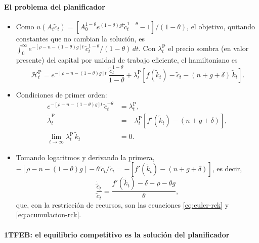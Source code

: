 \documentclass[11pt]{article}
\begin{document}
\paragraph{El problema del planificador}

\begin{itemize}
\item Como $u(A_t\tilde c_t)=\left[A_0^{1-\theta}e^{(1-\theta)gt}\tilde c_t^{1-\theta}-1\right]/(1-\theta)$, el objetivo, quitando constantes que no cambian la solución, es $\int_0^{\infty}e^{-[\rho-n-(1-\theta)g]t}\,\tilde c_t^{1-\theta}/(1-\theta)\,dt$. Con $\lambda^{\mathrm{P}}_t$ el precio sombra (en valor presente) del capital por unidad de trabajo eficiente, el hamiltoniano es
  \[\mathcal{H}^{\mathrm{P}}_t=e^{-[\rho-n-(1-\theta)g]t}\,\frac{\tilde c_t^{1-\theta}}{1-\theta}+\lambda^{\mathrm{P}}_t\left[f(\tilde k_t)-\tilde c_t-(n+g+\delta)\,\tilde k_t\right].\]
\item Condiciones de primer orden:
  \begin{align*}
  e^{-[\rho-n-(1-\theta)g]t}\,\tilde c_t^{-\theta}&=\lambda^{\mathrm{P}}_t,\\
  \dot\lambda^{\mathrm{P}}_t&=-\lambda^{\mathrm{P}}_t\left[f'(\tilde k_t)-(n+g+\delta)\right],\\
  \lim_{t\to\infty}\lambda^{\mathrm{P}}_t\,\tilde k_t&=0.
  \end{align*}
\item Tomando logaritmos y derivando la primera, $-[\rho-n-(1-\theta)g]-\theta\,\dot{\tilde c}_t/\tilde c_t=-[f'(\tilde k_t)-(n+g+\delta)]$, es decir,
  \[\frac{\dot{\tilde c}_t}{\tilde c_t}=\frac{f'(\tilde k_t)-\delta-\rho-\theta g}{\theta},\]
  que, con la restricción de recursos, son las ecuaciones \eqref{eq:euler-rck} y \eqref{eq:acumulacion-rck}.
\end{itemize}

\paragraph{1TFEB: el equilibrio competitivo es la solución del planificador}
\end{document}
